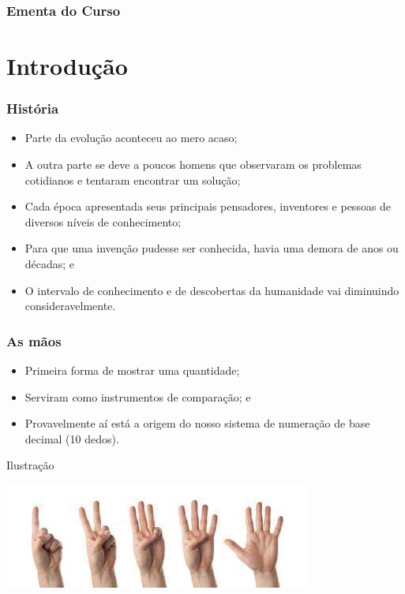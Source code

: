 \documentclass[aspectratio=169]{beamer} %
\begin{document}
\begin{frame}
	\frametitle{Ementa do Curso}
  	\tableofcontents
\end{frame}


\section{Introdução}

\begin{frame}
	\frametitle{História}
	
	\begin{itemize}
		\item Parte da evolução aconteceu ao mero acaso;
		\item A outra parte se deve a poucos homens que observaram os problemas cotidianos e tentaram encontrar um solução;
		\item Cada época apresentada seus principais pensadores, inventores e pessoas de diversos níveis de conhecimento;
		\item Para que uma invenção pudesse ser conhecida, havia uma demora de anos ou décadas; e
		\item O intervalo de conhecimento e de descobertas da humanidade vai diminuindo consideravelmente.
	\end{itemize}
\end{frame}

\begin{frame}
	\frametitle{As mãos}
	
	\begin{itemize}
		\item Primeira forma de mostrar uma quantidade; 
		\item Serviram como instrumentos de comparação; e
		\item Provavelmente aí está a origem do nosso sistema de numeração de base decimal (10 dedos).
	\end{itemize}\vfill
	
	\begin{exampleblock}{Ilustra\c cão}
		\begin{center}
			\includegraphics[scale=0.5]{img/dedos}
		\end{center}
	\end{exampleblock}
\end{frame}
\end{document}
